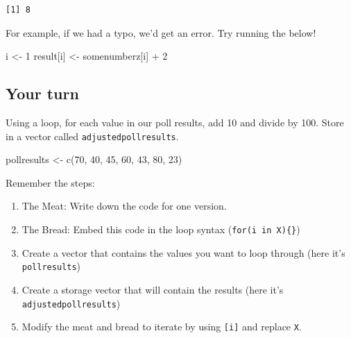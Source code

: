\documentclass[
  letterpaper,
  DIV=11,
  numbers=noendperiod]{scrreprt}
\newenvironment{Shaded}{\begin{snugshade}}{\end{snugshade}}
\newcommand{\DecValTok}[1]{\textcolor[rgb]{0.68,0.00,0.00}{#1}}
\newcommand{\FunctionTok}[1]{\textcolor[rgb]{0.28,0.35,0.67}{#1}}
\newcommand{\NormalTok}[1]{\textcolor[rgb]{0.00,0.23,0.31}{#1}}
\newcommand{\OtherTok}[1]{\textcolor[rgb]{0.00,0.23,0.31}{#1}}
\newcommand{\SpecialCharTok}[1]{\textcolor[rgb]{0.37,0.37,0.37}{#1}}
\providecommand{\tightlist}{%
  \setlength{\itemsep}{0pt}\setlength{\parskip}{0pt}}\usepackage{longtable,booktabs,array}
\begin{document}
\begin{verbatim}
[1] 8
\end{verbatim}

For example, if we had a typo, we'd get an error. Try running the below!

\begin{Shaded}
\begin{Highlighting}[]
\NormalTok{i }\OtherTok{\textless{}{-}} \DecValTok{1}
\NormalTok{result[i] }\OtherTok{\textless{}{-}}\NormalTok{ somenumberz[i] }\SpecialCharTok{+} \DecValTok{2}
\end{Highlighting}
\end{Shaded}

\hypertarget{your-turn}{%
\subsection{Your turn}\label{your-turn}}

Using a loop, for each value in our poll results, add 10 and divide by
100. Store in a vector called \texttt{adjustedpollresults}.

\begin{Shaded}
\begin{Highlighting}[]
\NormalTok{pollresults }\OtherTok{\textless{}{-}} \FunctionTok{c}\NormalTok{(}\DecValTok{70}\NormalTok{, }\DecValTok{40}\NormalTok{, }\DecValTok{45}\NormalTok{, }\DecValTok{60}\NormalTok{, }\DecValTok{43}\NormalTok{, }\DecValTok{80}\NormalTok{, }\DecValTok{23}\NormalTok{)}
\end{Highlighting}
\end{Shaded}

Remember the steps:

\begin{enumerate}
\def\labelenumi{\arabic{enumi}.}
\tightlist
\item
  The Meat: Write down the code for one version.
\item
  The Bread: Embed this code in the loop syntax
  (\texttt{for(i\ in\ X)\{\}})
\item
  Create a vector that contains the values you want to loop through
  (here it's \texttt{pollresults})
\item
  Create a storage vector that will contain the results (here it's
  \texttt{adjustedpollresults})
\item
  Modify the meat and bread to iterate by using \texttt{{[}i{]}} and
  replace \texttt{X}.
\end{enumerate}
\end{document}
